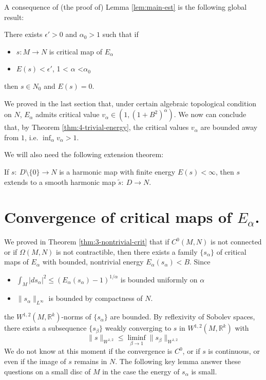 A consequence of (the proof of) Lemma \ref{lem:main-est} is the following global result:

\begin{theorem}
\label{thm:4-trivial-energy}
There exists \(\epsilon' >0\) and \(\alpha_0 > 1\)  such that if
\begin{itemize}
\item \(s: M \longrightarrow N\) is critical map of \(E_\alpha\)
\item \(E(s)<\epsilon'\), 1 < \(\alpha\) <\(\alpha_{\text{0}}\)
\end{itemize}
then \(s\in N_0\) and \(E(s) = 0\).
\end{theorem}

We proved in the last section that, under certain algebraic topological condition on \(N\), \(E_\alpha\) admits critical value \(v_\alpha \in (1, (1+B^2)^\alpha)\). We now
can conclude that, by Theorem \ref{thm:4-trivial-energy}, the critical values \(v_\alpha\)
are bounded away from \(1\), i.e. \(\inf_{\alpha} v_\alpha > 1\).


We will also need the following extension theorem:

\begin{theorem}
\label{thm:extension-sacks-uhlenbeck}
If \(s:\ D\setminus \{0\} \longrightarrow N\) is a harmonic map with finite energy \(E(s) < \infty\), then \(s\) extends to a smooth harmonic map \(\tilde s:\ D \longrightarrow N\).
\end{theorem}



\section{Convergence of critical maps of \(E_{\alpha}\).}
\label{sec:orgfd03f49}

We proved in Theorem \ref{thm:3-nontrivial-crit} that if \(C^0(M,N)\) is not connected or
if \(\Omega(M,N)\) is not contractible, then there exists a family \(\{s_\alpha\}\) of
critical maps  of \(E_\alpha\) with bounded, nontrivial energy \(E_\alpha(s_\alpha) < B\). Since 
\begin{itemize}
\item \(\int_M |ds_\alpha|^2 \leq \left(E_\alpha(s_\alpha)-1\right)^{1/\alpha}\) is bounded
uniformly on \(\alpha\)
\item \(\|s_\alpha\|_{L^\infty}\) is bounded by compactness of \(N\).
\end{itemize}
the \(W^{1,2}(M, \mathbb{R}^k)\)-norms of \(\{s_\alpha\}\) are bounded. By
reflexivity of Sobolev spaces, there exists a subsequence \(\{s_\beta\}\) weakly
converging to \(s\) in \(W^{1,2}(M,\mathbb{R}^k)\) with
\[
\|s\|_{W^{1,2}}\leq \liminf_{\beta\to 1} \|s_\beta\|_{W^{1,2}}
\]
We do not know at this moment if the convergence is \(C^0\), or if \(s\) is
continuous, or even if the image of \(s\) remains in \(N\). The following key lemma
answer these questions on a small disc of \(M\) in the case the energy of \(s_\alpha\)
is small.


